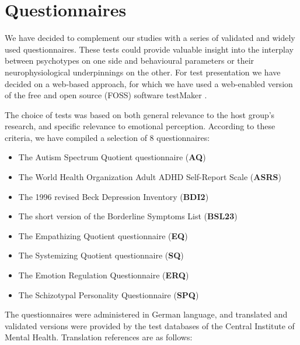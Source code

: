    \section{Questionnaires}\label{sec:m_q}
	We have decided to complement our studies with a series of validated and widely used questionnaires.
	These tests could provide valuable insight into the interplay between psychotypes on one side and behavioural parameters or their neurophysiological underpinnings on the other.
	For test presentation we have decided on a web-based approach, for which we have used a web-enabled version of the free and open source (FOSS) software testMaker \citep{testmaker}.
	
	The choice of tests was based on both general relevance to the host group's research, and specific relevance to emotional perception.
	According to these criteria, we have compiled a selection of 8 questionnaires:
	\begin{itemize}
	    \item The Autism Spectrum Quotient questionnaire (\textbf{AQ}) \citep{Baron-Cohen2001}
	    \item The World Health Organization Adult ADHD Self-Report Scale (\textbf{ASRS}) \citep{Kessler2005}
	    \item The 1996 revised Beck Depression Inventory (\textbf{BDI2}) \citep{Beck1996}
	    \item The short version of the Borderline Symptoms List (\textbf{BSL23}) \citep{Bohus2009}
	    \item The Empathizing Quotient questionnaire (\textbf{EQ}) \citep{Baron-Cohen2004}
	    \item The Systemizing Quotient questionnaire (\textbf{SQ}) \citep{Baron-Cohen2003a}
	    \item The Emotion Regulation Questionnaire (\textbf{ERQ}) \citep{Gross2003}
	    \item The Schizotypal Personality Questionnaire (\textbf{SPQ}) \citep{Raine1991}
	\end{itemize}
	The questionnaires were administered in German language, and translated and validated versions were provided by the test databases of the Central Institute of Mental Health.
	Translation references are as follows:
